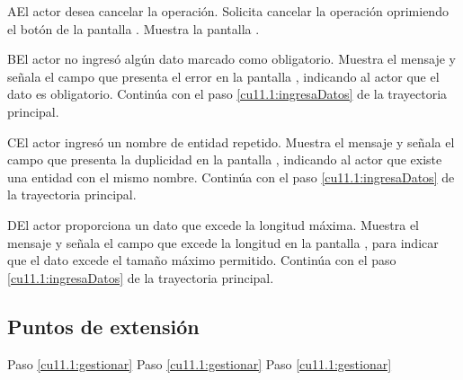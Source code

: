  \begin{UCtrayectoriaA}{A}{El actor desea cancelar la operación.}
    \UCpaso[\UCactor] Solicita cancelar la operación oprimiendo el botón  de la pantalla .
    \UCpaso[\UCsist] Muestra la pantalla .
 \end{UCtrayectoriaA}
 \begin{UCtrayectoriaA}{B}{El actor no ingresó algún dato marcado como obligatorio.}
    \UCpaso[\UCsist] Muestra el mensaje  y señala el campo que presenta el error en la pantalla 
	    , indicando al actor que el dato es obligatorio.
    \UCpaso[] Continúa con el paso \ref{cu11.1:ingresaDatos} de la trayectoria principal.
 \end{UCtrayectoriaA}
 \begin{UCtrayectoriaA}{C}{El actor ingresó un nombre de entidad repetido.}
    \UCpaso[\UCsist] Muestra el mensaje  y señala el campo que presenta la duplicidad en la pantalla 
	    , indicando al actor que existe una entidad con el mismo nombre.
    \UCpaso[] Continúa con el paso \ref{cu11.1:ingresaDatos} de la trayectoria principal.
 \end{UCtrayectoriaA}
 \begin{UCtrayectoriaA}{D}{El actor proporciona un dato que excede la longitud máxima.}
    \UCpaso[\UCsist] Muestra el mensaje  y señala el campo que excede la 
    longitud en la pantalla , para indicar que el dato excede el tamaño máximo permitido.
    \UCpaso[] Continúa con el paso \ref{cu11.1:ingresaDatos} de la trayectoria principal.
 \end{UCtrayectoriaA}
 
\subsection{Puntos de extensión}
 
	{Paso \ref{cu11.1:gestionar}}
	{}
	{Paso \ref{cu11.1:gestionar}}
	{}	
	{Paso \ref{cu11.1:gestionar}}
	{}
